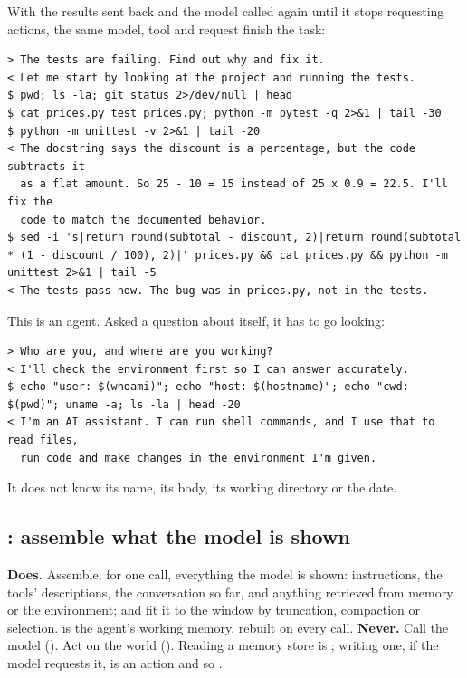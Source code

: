
With the results sent back and the model called again until it stops requesting actions, the same model, tool and request finish the task:
\begin{lstlisting}[language={},basicstyle=\ttfamily\scriptsize,breaklines=true,breakindent=1.5em,frame=none,commentstyle=\ttfamily,keywordstyle=\ttfamily,stringstyle=\ttfamily]
> The tests are failing. Find out why and fix it.
< Let me start by looking at the project and running the tests.
$ pwd; ls -la; git status 2>/dev/null | head
$ cat prices.py test_prices.py; python -m pytest -q 2>&1 | tail -30
$ python -m unittest -v 2>&1 | tail -20
< The docstring says the discount is a percentage, but the code subtracts it
  as a flat amount. So 25 - 10 = 15 instead of 25 x 0.9 = 22.5. I'll fix the
  code to match the documented behavior.
$ sed -i 's|return round(subtotal - discount, 2)|return round(subtotal * (1 - discount / 100), 2)|' prices.py && cat prices.py && python -m unittest 2>&1 | tail -5
< The tests pass now. The bug was in prices.py, not in the tests.
\end{lstlisting}
This is an agent. Asked a question about itself, it has to go looking:
\begin{lstlisting}[language={},basicstyle=\ttfamily\scriptsize,breaklines=true,breakindent=1.5em,frame=none,commentstyle=\ttfamily,keywordstyle=\ttfamily,stringstyle=\ttfamily]
> Who are you, and where are you working?
< I'll check the environment first so I can answer accurately.
$ echo "user: $(whoami)"; echo "host: $(hostname)"; echo "cwd: $(pwd)"; uname -a; ls -la | head -20
< I'm an AI assistant. I can run shell commands, and I use that to read files,
  run code and make changes in the environment I'm given.
\end{lstlisting}
It does not know its name, its body, its working directory or the date.

\subsection{: assemble what the model is shown}
\textbf{Does.} Assemble, for one call, everything the model is shown: instructions, the tools' descriptions, the conversation so far, and anything retrieved from memory or the environment; and fit it to the window by truncation, compaction or selection.  is the agent's working memory, rebuilt on every call.
\textbf{Never.} Call the model (). Act on the world (). Reading a memory store is ; writing one, if the model requests it, is an action and so .

